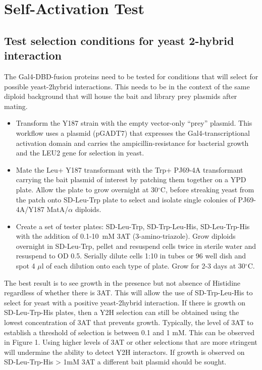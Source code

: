 \documentclass[11pt,fleqn]{book} %
\begin{document}
\section{Self-Activation Test}

\subsection{Test selection conditions for yeast 2-hybrid interaction}

The Gal4-DBD-fusion proteins need to be tested for conditions that will select for possible yeast-2hybrid interactions. This needs to be in the context of the same diploid background that will house the bait and library prey plasmids after mating. 

\begin{itemize}
    \item Transform the Y187 strain with the empty vector-only “prey” plasmid.  This workflow uses a plasmid (pGADT7) that expresses the Gal4-transcriptional activation domain and carries the ampicillin-resistance for bacterial growth and the LEU2 gene for selection in yeast.
    \item Mate the Leu+ Y187 transformant with the Trp+ PJ69-4A transformant carrying the bait plasmid of interest by patching them together on a YPD plate. Allow the plate to grow overnight at 30$^\circ$C, before streaking yeast from the patch onto SD-Leu-Trp plate to select and isolate single colonies of PJ69-4A/Y187 MatA/$\alpha$ diploids. 
    \item Create a set of tester plates: SD-Leu-Trp, SD-Trp-Leu-His, SD-Leu-Trp-His with the addition of 0.1-10~mM 3AT (3-amino-triazole).  Grow diploids overnight in SD-Leu-Trp, pellet and resuspend cells twice in sterile water and resuspend to OD 0.5. Serially dilute cells 1:10 in tubes or 96 well dish and spot 4 $\mu$l of each dilution onto each type of plate. Grow for 2-3 days at 30$^\circ$C.
\end{itemize}


\begin{remark}
    The best result is to see growth in the presence but not absence of Histidine regardless of whether there is 3AT.  This will allow the use of SD-Trp-Leu-His to select for yeast with a positive yeast-2hybrid interaction.  If there is growth on SD-Leu-Trp-His plates, then a Y2H selection can still be obtained using the lowest concentration of 3AT that prevents growth.  Typically, the level of 3AT to establish a threshold of selection is between 0.1 and 1 mM.  This can be observed in Figure 1. Using higher levels of 3AT or other selections that are more stringent will undermine the ability to detect Y2H interactors.  If growth is observed on SD-Leu-Trp-His > 1mM 3AT a different bait plasmid should be sought.
\end{remark}
\end{document}
